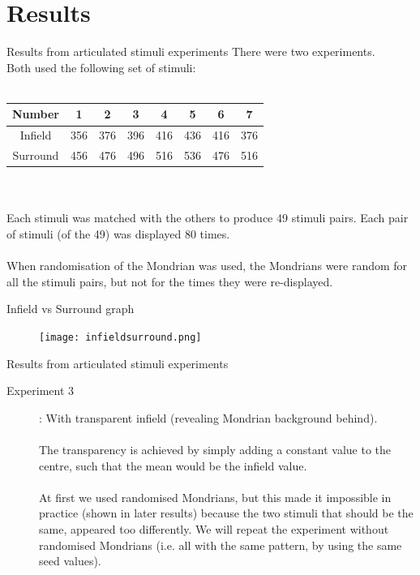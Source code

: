 \documentclass{beamer}
\begin{document}
\section{Results}
\begin{frame}[t]{Results from articulated stimuli experiments}
There were two experiments. \\Both used the following set of stimuli:\\
~\\
\begin{tabular}{c | c c c c c | c c}
Number & 1 & 2 & 3 & 4 & 5 & 6 & 7\\ \hline
Infield & 356 & 376 & 396 & 416 & 436 & 416 & 376\\ \hline
Surround & 456 & 476 & 496 & 516 & 536 & 476 & 516\\
\end{tabular}
\\
~\\
Each stimuli was matched with the others to produce 49 stimuli pairs. Each pair of stimuli (of the 49) was displayed 80 times.\\
~\\
When randomisation of the Mondrian was used, the Mondrians were random for all the stimuli pairs, but not for the times they were re-displayed.\\

\end{frame}
\begin{frame}[t]{Infield vs Surround graph}
\begin{figure}[c]
\texttt{[image: infieldsurround.png]}
\end{figure}
\end{frame}
\begin{frame}[t]{Results from articulated stimuli experiments}

\begin{description}
\item[Experiment 3]:  With transparent infield (revealing Mondrian background behind).\\
~\\
The transparency is achieved by simply adding a constant value to the centre, such that the mean would be the infield value. \\
~\\
At first we used randomised Mondrians, but this made it impossible in practice (shown in later results) because the two stimuli that should be the same, appeared too differently. We will repeat the experiment without randomised Mondrians (i.e. all with the same pattern, by using the same seed values).\\
\end{description}
\end{frame}
\end{document}
